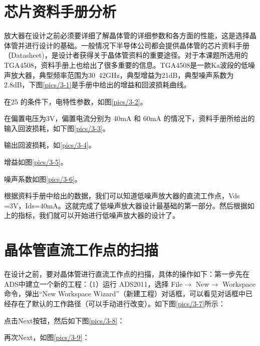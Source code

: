 \section{芯片资料手册分析}

放大器在设计之前必须要详细了解晶体管的详细参数和各方面的性能，这是选择晶体管并进行设计的基础。一般情况下半导体公司都会提供晶体管的芯片资料手册（Datasheet)，是设计者获得关于晶体管资料的重要途径。对于本课题所选用的TGA4508，资料手册上也给出了很多重要的信息。TGA4508是一款Ka波段的低噪声放大器，典型频率范围为30~42GHz，典型增益为21dB，典型噪声系数为2.8dB，下图\ref{pics/3-1}是手册中给出的增益和回波损耗曲线。

在25 \textcelsius 的条件下，电特性参数，如图\ref{pics/3-2}。

在偏置电压为3V，偏置电流分别为 40mA 和 60mA 的情况下，资料手册所给出的输入回波损耗，如下图\ref{pics/3-3}。

输出回波损耗，如\ref{pics/3-4}。

增益如图\ref{pics/3-5}。

噪声系数如图\ref{pics/3-6}。

根据资料手册中给出的数据，我们可以知道低噪声放大器的直流工作点，Vds =3V，Ids=40mA。这就完成了低噪声放大器设计最基础的第一部分。然后根据如上的指标，我们就可以开始进行低噪声放大器的设计了。

\section{晶体管直流工作点的扫描}

在设计之前，要对晶体管进行直流工作点的扫描，具体的操作如下：第一步先在ADS中建立一个新的工程：（1）运行 ADS2011，选择 File$\rightarrow$ New$\rightarrow$ Workspace 命令，弹出“New Workspace Wizard”（新建工程）对话框，可以看见对话框中已经存在了默认的工作路径（可以手动进行改变）。如下图\ref{pics/3-7}所示：

点击Next按钮，然后如下图\ref{pics/3-8}：

再次Next，如图\ref{pics/3-9}：

